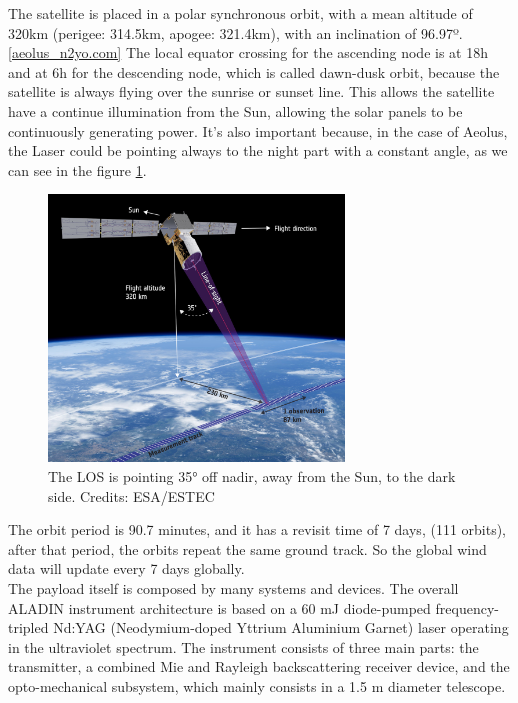 The satellite is placed in a polar synchronous orbit, with a mean altitude of
320km (perigee: 314.5km, apogee: 321.4km), with an inclination of 96.97º. \ref{aeolus_n2yo.com}
The local equator crossing for the ascending node is at 18h and at 6h for the descending
node, which is called dawn-dusk orbit, because the satellite is always flying over
the sunrise or sunset line. This allows the satellite have a continue illumination from
the Sun, allowing the solar panels to be continuously generating power. It's also
important because, in the case of Aeolus, the Laser could be pointing always to the
night part with a constant angle, as we can see in the figure \ref{fig:geometry}.\\

\begin{figure}[h]
	\centering
	\includegraphics[width=0.7\textwidth]{img/geometry.jpg}
	\caption[Geometry of measurements]{The LOS is pointing 35° off nadir,
	away from the Sun, to the dark side. Credits: ESA/ESTEC \cite{geometry}}
	\label{fig:geometry}
\end{figure}

The orbit period is 90.7 minutes, and it has a revisit time of 7 days, (111 orbits),
after that period, the orbits repeat the same ground track. So the global wind data
will update every 7 days globally.\\

The payload itself is composed by many systems and devices. The overall ALADIN
instrument architecture is based on a 60 mJ diode-pumped frequency-tripled
Nd:YAG (Neodymium-doped Yttrium Aluminium Garnet) laser operating in the
ultraviolet spectrum. The instrument consists of three main parts: the transmitter,
a combined Mie and Rayleigh backscattering receiver device, and the opto-mechanical
subsystem, which mainly consists in a 1.5 m diameter telescope.\\

